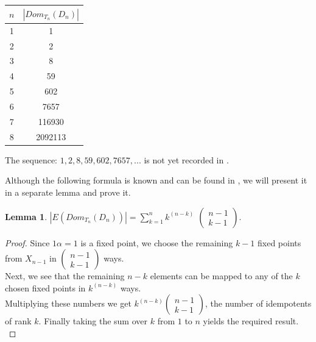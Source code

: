 \documentclass[10pt]{extarticle}
\numberwithin{equation}{section}
\numberwithin{bbb}{section}
\newtheorem{lemma}{Lemma}[section]
\numberwithin{equation}{section}
\begin{document}
\vspace{0.5cm}
\begin{center}
    \begin{tabular}{|c|c|}
    \hline
    $n$  & $|Dom_{T_n}(D_n)|$ \\
    \hline
    1  & 1 \\
        \hline
       2  & 2 \\
       \hline
       3  & 8 \\
        \hline
       4  & 59 \\
        \hline
       5  & 602  \\
        \hline
       6  &  7657\\
        \hline
       7  &  116930\\
        \hline
        8 & 2092113\\
        \hline
    \end{tabular}
\end{center}
\vspace{0.5cm}
The sequence: $1,2,8,59,602,7657,...$ is not yet recorded in \cite{seq}.

\vspace{0.9cm}
Although the following formula is known and can be found in \cite{seq}, we will present it in a separate lemma and prove it.
\begin{lemma}  
$|E(Dom_{T_n}(D_n))|=\sum_{k=1}^{n}k^{(n-k)}$
$\begin{pmatrix} n-1 \\ k-1 \end{pmatrix}.$
\end{lemma}

\begin{proof}
  Since $1\alpha=1$ is a fixed point, we choose the remaining $k-1$ fixed points from $X_{n-1}$ in $\begin{pmatrix} n-1 \\ k-1 \end{pmatrix}$ ways.\\
  Next, we see that the remaining $n-k$ elements can be mapped to any of the $k$ chosen fixed points in $k^{(n-k)}$ ways.\\
  Multiplying these numbers we get $k^{(n-k)} \begin{pmatrix} n-1 \\ k-1 \end{pmatrix}$, the number of idempotents of rank $k$. Finally taking the sum over $k$ from $1$ to $n$ yields the required result.\\
\end{proof}
\end{document}
